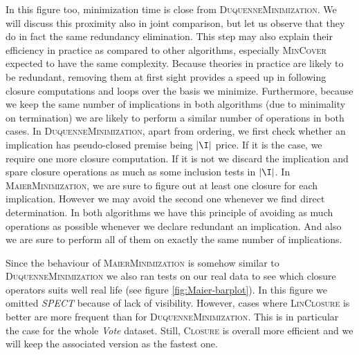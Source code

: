\begin{figure}[H]
	
\end{figure}

\begin{figure}[H]
	
\end{figure} 

\vspace{1.2em} 

In this figure too, minimization time is close from \textsc{DuquenneMinimization}. We will discuss this proximity also in joint comparison, but let us observe that they do in fact the same redundancy elimination. This step may also explain their efficiency in practice as compared to other algorithms, especially \textsc{MinCover} expected to have 
the same complexity. Because theories in practice are likely to be redundant,
removing them at first sight provides a speed up in following closure computations and loops over the basis we minimize. Furthermore, because we keep the same number of implications in both algorithms (due to minimality on termination) we are likely to perform a similar number of operations in both cases. In \textsc{DuquenneMinimization}, apart from ordering, we first check whether an implication has pseudo-closed premise being $|\I|$ price. If it is the case, we require one more closure computation. If it is not we discard the implication and spare closure operations as much as some inclusion tests in $|\I|$. In \textsc{MaierMinimization}, we are sure to figure out at least one closure for each implication. However we may avoid the second one whenever we find direct determination. In both algorithms we have this principle of avoiding as much operations as possible whenever we declare redundant an implication. And also we are sure to perform all of them on exactly the same number of implications.

\vspace{1.2em}

\noindent Since the behaviour of \textsc{MaierMinimization} is somehow similar to \textsc{DuquenneMinimization} we also ran tests on our real data to see which
closure operators suits well real life (see figure \ref{fig:Maier-barplot}). In
this figure we omitted \textit{SPECT} because of lack of visibility. However, cases where \textsc{LinClosure} is better are more frequent than for \textsc{DuquenneMinimization}. This is in particular the case for the whole \textit{Vote} dataset. Still, \textsc{Closure} is overall more efficient and 
we will keep the associated version as the fastest one.


